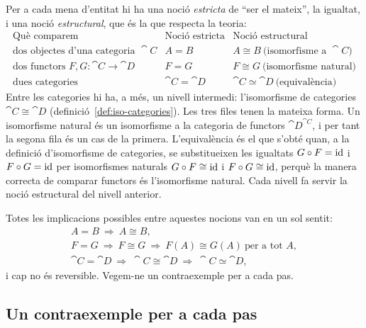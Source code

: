 Per a cada mena d'entitat hi ha una noció \emph{estricta} de \enquote{ser el mateix}, la igualtat, i una noció \emph{estructural}, que és la que respecta la teoria:
\[
\renewcommand{\arraystretch}{1.25}
\begin{array}{lll}
\text{Què comparem} & \text{Noció estricta} & \text{Noció estructural}\\\hline
\text{dos objectes d'una categoria }\cat{C} & A=B & A\cong B\ \text{(isomorfisme a }\cat{C})\\
\text{dos functors }F,G\colon\cat{C}\to\cat{D} & F=G & F\cong G\ \text{(isomorfisme natural)}\\
\text{dues categories} & \cat{C}=\cat{D} & \cat{C}\simeq\cat{D}\ \text{(equivalència)}
\end{array}
\]
Entre les categories hi ha, a més, un nivell intermedi: l'isomorfisme de categories $\cat{C}\cong\cat{D}$ (definició~\ref{def:iso-categories}). Les tres files tenen la mateixa forma. Un isomorfisme natural és un isomorfisme a la categoria de functors $\cat{D}^{\cat{C}}$, i per tant la segona fila és un cas de la primera. L'equivalència és el que s'obté quan, a la definició d'isomorfisme de categories, se substitueixen les igualtats $G\circ F=\operatorname{id}$ i $F\circ G=\operatorname{id}$ per isomorfismes naturals $G\circ F\cong\operatorname{id}$ i $F\circ G\cong\operatorname{id}$, perquè la manera correcta de comparar functors és l'isomorfisme natural. Cada nivell fa servir la noció estructural del nivell anterior.

Totes les implicacions possibles entre aquestes nocions van en un sol sentit:
\[
\begin{gathered}
A=B\ \Rightarrow\ A\cong B,\\
F=G\ \Rightarrow\ F\cong G\ \Rightarrow\ F(A)\cong G(A)\ \text{per a tot }A,\\
\cat{C}=\cat{D}\ \Rightarrow\ \cat{C}\cong\cat{D}\ \Rightarrow\ \cat{C}\simeq\cat{D},
\end{gathered}
\]
i cap no és reversible. Vegem-ne un contraexemple per a cada pas.

\subsection{Un contraexemple per a cada pas}


